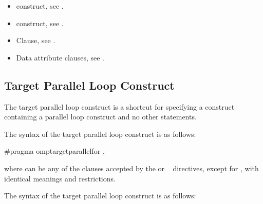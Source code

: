 {{{{\crossreferences
\begin{itemize}
\item {} construct, see 
.

\item {} construct, see 
.

\item {} Clause, see .

\item Data attribute clauses, see 
.


\end{itemize}










\subsection{Target Parallel Loop Construct}
\label{subsec:Target Parallel Loop Construct}
\summary
The target parallel loop construct is a shortcut for specifying a  
construct containing a parallel loop construct and no other statements.

\syntax
\ccppspecificstart
The syntax of the target parallel loop construct is as follows:

\begin{boxedcode}
\#pragma omp\plc{ }target\plc{ }parallel\plc{ }for \plc{[clause[ [},\plc{] clause] ... ] new-line}
\end{boxedcode}

where  can be any of the clauses accepted by the  or
~ directives, except for , with identical meanings and restrictions.
\ccppspecificend

\begin{samepage}
\fortranspecificstart
The syntax of the target parallel loop construct is as follows:


\end{samepage}}}}}
